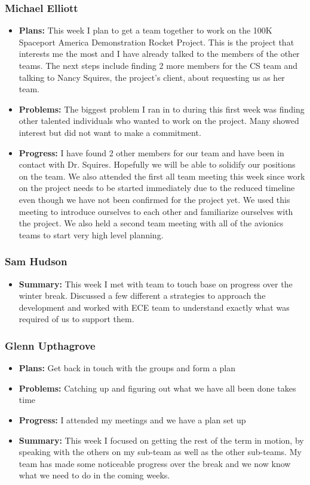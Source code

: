 \documentclass[onecolumn, draftclsnofoot,10pt, compsoc]{IEEEtran}
\begin{document}
\subsubsection{Michael Elliott}
\begin {itemize}
\item \textbf{Plans: }
 This week I plan to get a team together to work on the 100K Spaceport America Demonstration Rocket Project. This is the project that interests me the most and I have already talked to the members of the other teams. The next steps include finding 2 more members for the CS team and talking to Nancy Squires, the project's client, about requesting us as her team.
\item \textbf{Problems: }
  The biggest problem I ran in to during this first week was finding other talented individuals who wanted to work on the project. Many showed interest but did not want to make a commitment.
\item \textbf{Progress: }
  I have found 2 other members for our team and have been in contact with Dr. Squires. Hopefully we will be able to solidify our positions on the team. We also attended the first all team meeting this week since work on the project needs to be started immediately due to the reduced timeline even though we have not been confirmed for the project yet. We used this meeting to introduce ourselves to each other and familiarize ourselves with the project. We also held a second team meeting with all of the avionics teams to start very high level planning.
\end {itemize}
\subsubsection{Sam Hudson}
\begin {itemize}
\item \textbf{Summary: }This week I met with team to touch base on progress over the winter break. Discussed a few different a strategies to approach the development and worked with ECE team to understand exactly what was required of us to support them.
\end {itemize}
\subsubsection{Glenn Upthagrove}
\begin {itemize}
 \item \textbf{Plans: }Get back in touch with the groups and form a plan  
 \item \textbf{Problems: }Catching up and figuring out what we have all been done takes time 
 \item \textbf{Progress: }I attended my meetings and we have a plan set up 
 \item \textbf{Summary: }This week I focused on getting the rest of the term in motion, by speaking with the others on my sub-team as well as the other sub-teams. My team has made some noticeable progress over the break and we now know what we need to do in the coming weeks.  
\end {itemize}
\end{document}
